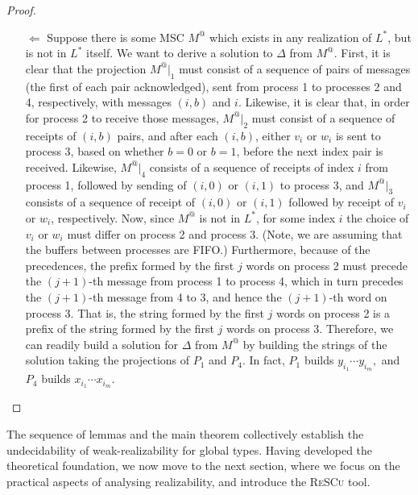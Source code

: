 \begin{proof}
\begin{itemize}
		\item[$\Leftarrow$]
		      Suppose there is some MSC $M^@$ which
		      exists in any realization of $L^*$, but is not in $L^*$ itself. We want
		      to derive a solution to $\Delta$ from $M^@$.
		      First, it is clear that the projection $M^@|_1$ must consist of a sequence
		      of pairs of messages (the first of each pair acknowledged), sent from
		      process 1 to processes 2 and 4, respectively, with messages $(i, b)$ and $i$.
		      Likewise, it is clear that, in order for process 2 to receive those messages,
		      $M^@|_2$ must consist of a sequence of receipts of $(i, b)$ pairs, and after
		      each $(i, b)$, either $v_i$ or $w_i$ is sent to process 3, based on whether
		      $b = 0$ or $b = 1$, before the next index pair is received.
		      Likewise, $M^@|_4$ consists of a sequence of receipts of index $i$ from
		      process 1, followed by sending of $(i, 0)$ or $(i, 1)$ to process 3, and
		      $M^@|_3$ consists of a sequence of receipt of $(i, 0)$ or $(i, 1)$ followed
		      by receipt of $v_i$ or $w_i$, respectively.
		      Now, since $M^@$ is not in $L^*$, for some index $i$ the choice of $v_i$ or
		      $w_i$ must differ on process 2 and process 3. (Note, we are assuming that
		      the buffers between processes are FIFO.)
		      Furthermore, because of the precedences, the prefix formed by the first
		      $j$ words on process 2 must precede the $(j + 1)$-th message from
		      process 1 to process 4, which in turn precedes the $(j + 1)$-th message
		      from 4 to 3, and hence the $(j + 1)$-th word on process 3. That is, the
		      string formed by the first $j$ words on process 2 is a prefix of the string
		      formed by the first $j$ words on process 3. Therefore, we can readily
		      build a solution for $\Delta$ from $M^@$ by building the strings of the solution
		      taking the projections of $P_1$ and $P_4$. In fact, $P_1$ builds 
			  $y_{i_1}\cdots y_{i_m},$ and $P_4$ builds $x_{i_1}\cdots x_{i_m}$.

	\end{itemize}

\end{proof}


The sequence of lemmas and the main theorem collectively establish the
undecidability of weak-realizability for global types. Having developed the
theoretical foundation, we now move to the next section, where we focus on the
practical aspects of analysing realizability, and introduce the \textsc{ReSCu} tool.